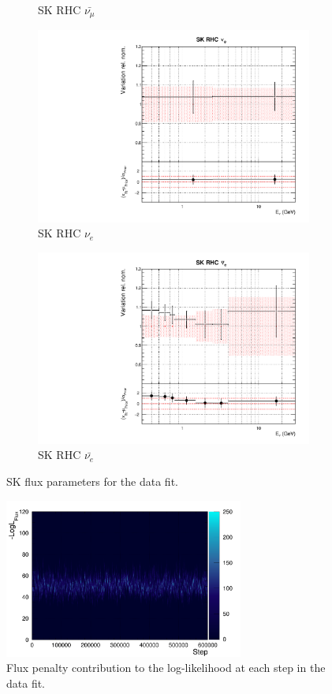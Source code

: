 \begin{figure}[!htbp]
\begin{subfigure}{0.45\textwidth}
  \caption{SK RHC $\bar{\nu_{\mu}}$}
\end{subfigure}
\begin{subfigure}{0.45\textwidth}
  \centering
  \includegraphics[width=0.75\linewidth]{figs/datflux14}
  \caption{SK RHC $\nu_{e}$}
\end{subfigure}
\begin{subfigure}{0.45\textwidth}
  \centering
  \includegraphics[width=0.75\linewidth]{figs/datflux15}
  \caption{SK RHC $\bar{\nu_e}$}
\end{subfigure}
\caption{SK flux parameters for the data fit.}
\label{fig:datfluxSK}
\end{figure}

\begin{figure}[!htbp]
\centering
\includegraphics*[width=0.7\textwidth,clip]{figs/llh_fluxdat}
\caption{Flux penalty contribution to the log-likelihood at each step in the data fit.}\label{fig:llh_fluxdat}
\end{figure}

